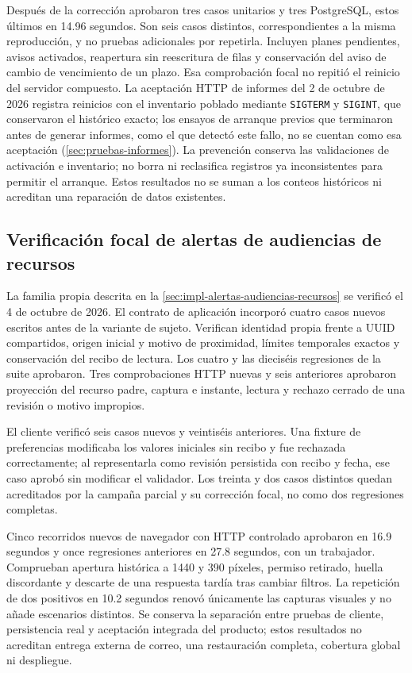 Después de la corrección aprobaron tres casos unitarios y tres PostgreSQL, estos últimos en 14.96 segundos. Son seis casos distintos, correspondientes a la misma reproducción, y no pruebas adicionales por repetirla. Incluyen planes pendientes, avisos activados, reapertura sin reescritura de filas y conservación del aviso de cambio de vencimiento de un plazo. Esa comprobación focal no repitió el reinicio del servidor compuesto. La aceptación HTTP de informes del 2 de octubre de 2026 registra reinicios con el inventario poblado mediante \texttt{SIGTERM} y \texttt{SIGINT}, que conservaron el histórico exacto; los ensayos de arranque previos que terminaron antes de generar informes, como el que detectó este fallo, no se cuentan como esa aceptación (\cref{sec:pruebas-informes}). La prevención conserva las validaciones de activación e inventario; no borra ni reclasifica registros ya inconsistentes para permitir el arranque. Estos resultados no se suman a los conteos históricos ni acreditan una reparación de datos existentes.

\subsection{Verificación focal de alertas de audiencias de recursos}\label{sec:pruebas-alertas-audiencias-recursos}

La familia propia descrita en la \cref{sec:impl-alertas-audiencias-recursos} se verificó el 4 de octubre de 2026. El contrato de aplicación incorporó cuatro casos nuevos escritos antes de la variante de sujeto. Verifican identidad propia frente a UUID compartidos, origen inicial y motivo de proximidad, límites temporales exactos y conservación del recibo de lectura. Los cuatro y las dieciséis regresiones de la suite aprobaron. Tres comprobaciones HTTP nuevas y seis anteriores aprobaron proyección del recurso padre, captura e instante, lectura y rechazo cerrado de una revisión o motivo impropios.

El cliente verificó seis casos nuevos y veintiséis anteriores. Una fixture de preferencias modificaba los valores iniciales sin recibo y fue rechazada correctamente; al representarla como revisión persistida con recibo y fecha, ese caso aprobó sin modificar el validador. Los treinta y dos casos distintos quedan acreditados por la campaña parcial y su corrección focal, no como dos regresiones completas.

Cinco recorridos nuevos de navegador con HTTP controlado aprobaron en 16.9 segundos y once regresiones anteriores en 27.8 segundos, con un trabajador. Comprueban apertura histórica a 1440 y 390 píxeles, permiso retirado, huella discordante y descarte de una respuesta tardía tras cambiar filtros. La repetición de dos positivos en 10.2 segundos renovó únicamente las capturas visuales y no añade escenarios distintos. Se conserva la separación entre pruebas de cliente, persistencia real y aceptación integrada del producto; estos resultados no acreditan entrega externa de correo, una restauración completa, cobertura global ni despliegue.

